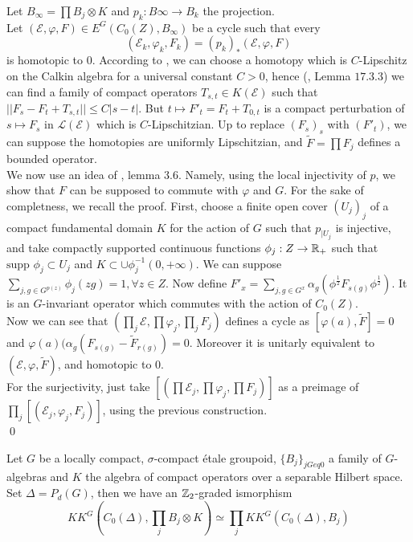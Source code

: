 \begin{dem}
Let $B_\infty = \prod B_j\otimes K$ and $p_k : B\infty \rightarrow B_k$ the projection.\\
Let $(\mathcal E ,\varphi,F)\in E^G(C_0(Z), B_\infty)$ be a cycle such that every 
\[(\mathcal E_k , \varphi_k,F_k)=(p_k)_*(\mathcal E ,\varphi,F)\] 
is homotopic to $0$. 
According to \cite{OY3}, we can choose a homotopy which is $C$-Lipschitz on the Calkin algebra for a universal constant $C>0$, hence (\cite{WeggeOlsen}, Lemma $17.3.3$) we can find a family of compact operators $T_{s,t}\in K(\mathcal E)$ such that $||F_s-F_t+T_{s,t}||\leq C|s-t|$. But $t\mapsto F'_t= F_{t}+T_{0,t}$ is a compact perturbation of $s\mapsto F_s$ in $\mathcal L(\mathcal E)$ which is $C$-Lipschitzian. Up to replace $(F_s)_s$ with $(F'_t)$, we can suppose the homotopies are uniformly Lipschitzian, and $\tilde F=\prod F_j$ defines a bounded operator.\\
We now use an idea of \cite{TuBC2}, lemma $3.6$. Namely, using the local injectivity of $p$, we show that $F$ can be supposed to commute with $\varphi$ and $G$. For the sake of completness, we recall the proof. First, choose a finite open cover $(U_j)_j$ of a compact fundamental domain $K$ for the action of $G$ such that $p_{|U_j}$ is injective, and take compactly supported continuous functions $\phi_j : Z\rightarrow \mathbb R_+$ such that $\text{supp }\phi_j \subset U_j$ and $K\subset \cup \phi_j^{-1}(0,+\infty)$. We can suppose $\sum_{j,g\in G^{p(z)}} \phi_j (zg) = 1,\forall z\in Z$. Now define $F'_x = \sum_{j, g\in G^x} \alpha_g (\phi^{\frac{1}{2}} F_{s(g)}\phi^{\frac{1}{2}})$. It is an $G$-invariant operator which commutes with the action of $C_0(Z)$.\\
Now we can see that $(\prod_j \mathcal E , \prod \varphi_j , \prod_j F_j)$ defines a cycle as $[\varphi(a),\tilde F]=0$ and $\varphi(a)(\alpha_g(F_{s(g)}-\tilde F_{r(g)})=0$. Moreover it is unitarly equivalent to $(\mathcal E,\varphi, \tilde F )$, and homotopic to $0$.\\
For the surjectivity, just take $[(\prod \mathcal E_j,\prod \varphi_j,\prod F_j)]$ as a preimage of $\prod_j [(\mathcal E_j, \varphi_j,F_j)]$, using the previous construction.\\
\qed  
\end{dem}

\begin{lem}\label{prod}
Let $G$ be a locally compact, $\sigma$-compact étale groupoid, $\{B_j\}_{jGeq 0}$ a family of $G$-algebras and $K$ the algebra of compact operators over a separable Hilbert space. Set $\Delta=P_d(G)$, then we have an $\mathbb Z_2$-graded ismorphism 
\[KK^G(C_0(\Delta),\prod_j B_j\otimes K)\simeq \prod_j KK^G(C_0(\Delta),B_j)\]
\end{lem}

